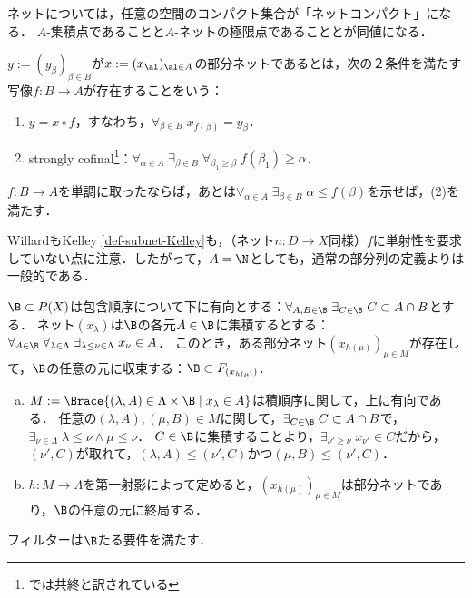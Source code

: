 \documentclass[uplatex,dvipdfmx]{jsreport}
\begin{document}
\begin{tcolorbox}[colframe=ForestGreen, colback=ForestGreen!10!white,breakable,colbacktitle=ForestGreen!40!white,coltitle=black,fonttitle=\bfseries\sffamily,
title=]
    ネットについては，任意の空間のコンパクト集合が「ネットコンパクト」になる．
    $A$-集積点であることと$A$-ネットの極限点であることとが同値になる．
\end{tcolorbox}

\begin{definition}\label{def-subnet-Kelley}
    $y:=(y_\beta)_{\beta\in B}$が$x:=(x_\al)_{\al\in A}$の部分ネットであるとは，次の２条件を満たす写像$f:B\to A$が存在することをいう：
    \begin{enumerate}
        \item $y=x\circ f$，すなわち，$\forall_{\beta\in B}\;x_{f(\beta)}=y_\beta$．
        \item strongly cofinal\footnote{\cite{彌永}では共終と訳されている}：$\forall_{\alpha\in A}\;\exists_{\beta\in B}\;\forall_{\beta_1\ge\beta}\;f(\beta_1)\ge\alpha$．
    \end{enumerate}
    $f:B\to A$を単調に取ったならば，あとは$\forall_{\alpha\in A}\;\exists_{\beta\in B}\;\alpha\le f(\beta)$を示せば，(2)を満たす．
\end{definition}

\begin{remark}
    WillardもKelley \ref{def-subnet-Kelley}も，（ネット$n:D\to X$同様）$f$に単射性を要求していない点に注意．したがって，$A=\N$としても，通常の部分列の定義よりは一般的である．
\end{remark}

\begin{lemma}[集積点の特徴付け]
    $\B\subset P(X)$は包含順序について下に有向とする：$\forall_{A,B\in\B}\;\exists_{C\in\B}\;C\subset A\cap B$とする．
    ネット$(x_\lambda)$は$\B$の各元$A\in\B$に集積するとする：
    $\forall_{A\in\B}\;\forall_{\lambda\in\Lambda}\;\exists_{\lambda\le\nu\in\Lambda}\;x_\nu\in A$．
    このとき，ある部分ネット$(x_{h(\mu)})_{\mu\in M}$が存在して，$\B$の任意の元に収束する：$\B\subset F_{(x_{h(\mu)})}$．
\end{lemma}
\begin{Proof}\mbox{}
    \begin{enumerate}[(a)]
        \item $M:=\Brace{(\lambda,A)\in\Lambda\times\B\mid x_\lambda\in A}$は積順序に関して，上に有向である．
        任意の$(\lambda,A),(\mu,B)\in M$に関して，$\exists_{C\in\B}\;C\subset A\cap B$で，$\exists_{\nu\in\Lambda}\;\lambda\le\nu\land\mu\le\nu$．
        $C\in\B$に集積することより，$\exists_{\nu'\ge\nu}\;x_{\nu'}\in C$だから，$(\nu',C)$が取れて，$(\lambda,A)\le(\nu',C)$かつ$(\mu,B)\le(\nu',C)$．
        \item $h:M\to\Lambda$を第一射影によって定めると，$(x_{h(\mu)})_{\mu\in M}$は部分ネットであり，$\B$の任意の元に終局する．
    \end{enumerate}
\end{Proof}
\begin{remarks}
    フィルターは$\B$たる要件を満たす．
\end{remarks}
\end{document}

